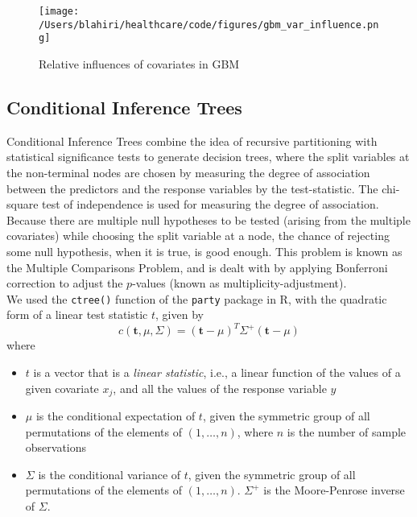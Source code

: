 \begin{figure}[!h]
    \centering
    \texttt{[image: /Users/blahiri/healthcare/code/figures/gbm\_var\_influence.png]}
    \caption{\small Relative influences of covariates in GBM}
    \label{fig:gbm_var_influence}
\end{figure}

\subsection{Conditional Inference Trees}
Conditional Inference Trees \cite{HHZ06} combine the idea of recursive partitioning with statistical significance tests to generate decision trees, where the split variables at the non-terminal nodes are chosen by measuring the degree of association between the predictors and the response variables by the test-statistic. The chi-square test of independence \cite{chi} is used for measuring the degree of association. Because there are multiple null hypotheses to be tested (arising from the multiple covariates) while choosing the split variable at a node, the chance of rejecting some null hypothesis, when it is true, is good enough. This problem is known as the Multiple Comparisons Problem, and is dealt with by applying Bonferroni correction to adjust the $p$-values (known as multiplicity-adjustment).\\

We used the \texttt{ctree()} function of the \texttt{party} package \cite{party} in R, with the quadratic form of a linear test statistic $t$, given by \cite{HHZ06}
\begin{equation}
\label{eqn:quad_form}
c(\mathbf{t}, \mu, \Sigma) = (\mathbf{t} - \mu)^{T}{\Sigma}^+(\mathbf{t} - \mu)
\end{equation}
where 
\begin{itemize}
\item $t$ is a vector that is a {\em linear statistic}, i.e., a linear function of the values of a given covariate $x_j$, and all the values of the response variable $y$
\item $\mu$ is the conditional expectation of $t$, given the symmetric group of all permutations of the elements of $(1,\ldots,n)$, where $n$ is the number of sample observations
\item $\Sigma$ is the conditional variance of $t$, given the symmetric group of all permutations of the elements of $(1,\ldots,n)$. ${\Sigma}^+$ is the Moore-Penrose inverse of $\Sigma$.
\end{itemize}

